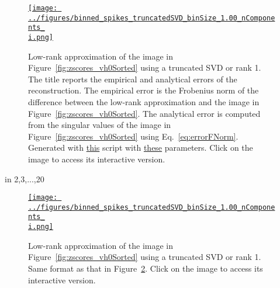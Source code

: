\documentclass[12pt]{article}
\begin{document}
\begin{appendices}

\def\i{1}
    \begin{figure}
        \begin{center}

            \href{http://www.gatsby.ucl.ac.uk/~rapela/neuroinformatics/2023/ws5/figures/binned_spikes_truncatedSVD_binSize_1.00_nComponents_\i.html}{\texttt{[image: ../figures/binned\_spikes\_truncatedSVD\_binSize\_1.00\_nComponents\_\\i.png]}}

            \caption{Low-rank approximation of the image in
            Figure~\ref{fig:zscores_vh0Sorted} using a truncated SVD or rank
            \i. The title reports the empirical and analytical errors of the
            reconstruction. The empirical error is the Frobenius norm of the
            difference between the low-rank approximation and the image in
            Figure~\ref{fig:zscores_vh0Sorted}. The analytical error is
            computed from the singular values of the image in
            Figure~\ref{fig:zscores_vh0Sorted} using Eq.~\ref{eq:errorFNorm}.
            Generated with
            \href{https://github.com/joacorapela/neuroinformatics23/blob/master/worksheets/ws5/mySolution/code/scripts/doPlotTruncatedSVD.py}{this}
            script with
            \href{https://github.com/joacorapela/neuroinformatics23/blob/master/worksheets/ws5/mySolution/code/scripts/doPlotTruncatedSVD.csh}{these}
            parameters.  Click on the image to access its interactive version.}

            \label{fig:truncatedSVD-rank\i}

        \end{center}
    \end{figure}
\foreach \i in {2,3,...,20}{
    \begin{figure}
        \begin{center}

            \href{http://www.gatsby.ucl.ac.uk/~rapela/neuroinformatics/2023/ws5/figures/binned_spikes_truncatedSVD_binSize_1.00_nComponents_\i.html}{\texttt{[image: ../figures/binned\_spikes\_truncatedSVD\_binSize\_1.00\_nComponents\_\\i.png]}}

            \caption{Low-rank approximation of the image in
            Figure~\ref{fig:zscores_vh0Sorted} using a truncated SVD or rank
            \i. Same format as that in Figure~\ref{fig:truncatedSVD-rank1}.
            Click on the image to
            access its interactive version.}

            \label{fig:truncatedSVD-rank\i}

        \end{center}
    \end{figure}
}

\end{appendices}
\end{document}
